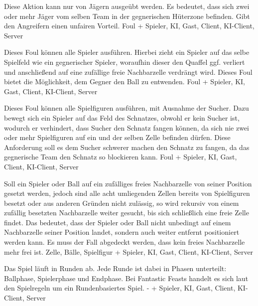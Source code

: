         {Diese Aktion kann nur von Jägern ausgeübt werden. Es bedeutet, dass sich zwei oder mehr Jäger vom selben Team in der gegnerischen Hüterzone befinden.}
        {Gibt den Angreifern einen unfairen Vorteil.}
        {Foul}
        {+}
        {Spieler, KI, Gast, Client, KI-Client, Server}

        {Dieses Foul können alle Spieler ausführen. Hierbei zieht ein Spieler auf das selbe Spielfeld wie ein gegnerischer Spieler, woraufhin dieser den Quaffel ggf. verliert und anschließend auf eine zufällige freie Nachbarzelle verdrängt wird.}
        {Dieses Foul bietet die Möglichkeit, dem Gegner den Ball zu entwenden.}
        {Foul}
        {+}
        {Spieler, KI, Gast, Client, KI-Client, Server}

        {Dieses Foul können alle Spielfiguren ausführen, mit Ausnahme der Sucher. Dazu bewegt sich ein Spieler auf das Feld des Schnatzes, obwohl er kein Sucher ist, wodurch er verhindert, dass Sucher den Schnatz fangen können, da sich nie zwei oder mehr Spielfiguren auf ein und der selben Zelle befinden dürfen.}
        {Diese Anforderung soll es dem Sucher schwerer machen den Schnatz zu fangen, da das gegnerische Team den Schnatz so blockieren kann.}
        {Foul}
        {+}
        {Spieler, KI, Gast, Client, KI-Client, Server}
        
        {Soll ein Spieler oder Ball auf ein zufälliges freies Nachbarzelle von seiner Position gesetzt werden, jedoch sind alle acht umliegenden Zellen bereits von Spielfiguren besetzt oder aus anderen Gründen nicht zulässig, so wird rekursiv von einem zufällig besetzten Nachbarzelle weiter gesucht, bis sich schließlich eine freie Zelle findet. Das bedeutet, dass der Spieler oder Ball nicht unbedingt auf einem Nachbarzelle seiner Position landet, sondern auch weiter entfernt positioniert werden kann.}
        {Es muss der Fall abgedeckt werden, dass kein freies Nachbarzelle mehr frei ist.}
        {Zelle, Bälle, Spielfigur}
        {+}
        {Spieler, KI, Gast, Client, KI-Client, Server}


        {Das Spiel läuft in Runden ab. Jede Runde ist dabei in Phasen unterteilt: Ballphase, Spielerphase und Endphase.}
        {Bei \glqq{}Fantastic Feasts\grqq{} handelt es sich laut den Spielregeln um ein Rundenbasiertes Spiel.}
        {-}
        {+}
        {Spieler, KI, Gast, Client, KI-Client, Server}

